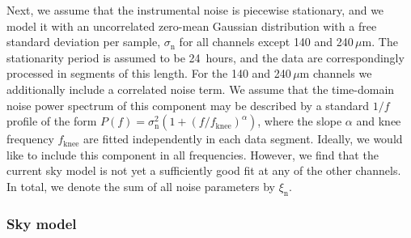 \documentclass{aa}
\begin{document}
Next, we assume that the instrumental noise is piecewise stationary,
and we model it with an uncorrelated zero-mean Gaussian distribution
with a free standard deviation per sample, $\sigma_{\mathrm{n}}$ for
all channels except {140 and} 240\,$\mu$m. The stationarity period is assumed to
be 24~hours, and the data are correspondingly processed in segments of
this length. For the {140 and} 240\,$\mu$m {channels} we additionally include a
correlated noise term.  We assume that the time-domain noise power
spectrum of this component may be described by a standard $1/f$
profile of the form $P(f) = \sigma_{\mathrm{n}}^2
(1+(f/f_{\mathrm{knee}})^{\alpha})$, where the slope $\alpha$ and knee
frequency $f_{\mathrm{knee}}$ are fitted independently in each data
segment. Ideally, we would like to include this component in all
frequencies. However, we find that the current sky model is not yet
a sufficiently good fit at any of the other channels. In
total, we denote the sum of all noise parameters by
$\xi_{\mathrm{n}}$.


\subsubsection{Sky model}
\label{sec:skymodel}
\end{document}
